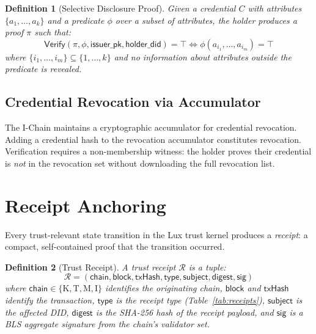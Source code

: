 \documentclass[11pt,a4paper]{article}
\newtheorem{definition}{Definition}[section]
\begin{document}
\begin{definition}[Selective Disclosure Proof]\label{def:zksd}
Given a credential $C$ with attributes $\{a_1, \ldots, a_k\}$ and a predicate
$\phi$ over a subset of attributes, the holder produces a proof $\pi$ such that:
\[
    \mathsf{Verify}(\pi, \phi, \mathsf{issuer\_pk}, \mathsf{holder\_did}) = \top
    \iff \phi(a_{i_1}, \ldots, a_{i_m}) = \top
\]
where $\{i_1, \ldots, i_m\} \subseteq \{1, \ldots, k\}$ and no information
about attributes outside the predicate is revealed.
\end{definition}

\subsection{Credential Revocation via Accumulator}

The I-Chain maintains a cryptographic accumulator for credential revocation.
Adding a credential hash to the revocation accumulator constitutes revocation.
Verification requires a non-membership witness: the holder proves their credential
is \emph{not} in the revocation set without downloading the full revocation list.

\section{Receipt Anchoring}\label{sec:receipts}

Every trust-relevant state transition in the Lux trust kernel produces a
\emph{receipt}: a compact, self-contained proof that the transition occurred.

\begin{definition}[Trust Receipt]\label{def:receipt}
A trust receipt $\mathcal{R}$ is a tuple:
\[
    \mathcal{R} = (\mathsf{chain}, \mathsf{block}, \mathsf{txHash},
                   \mathsf{type}, \mathsf{subject}, \mathsf{digest},
                   \mathsf{sig})
\]
where $\mathsf{chain} \in \{\text{K}, \text{T}, \text{M}, \text{I}\}$ identifies
the originating chain, $\mathsf{block}$ and $\mathsf{txHash}$ identify the
transaction, $\mathsf{type}$ is the receipt type (Table~\ref{tab:receipts}),
$\mathsf{subject}$ is the affected DID, $\mathsf{digest}$ is the SHA-256 hash
of the receipt payload, and $\mathsf{sig}$ is a BLS aggregate signature from the
chain's validator set.
\end{definition}
\end{document}
